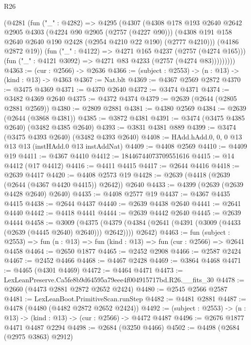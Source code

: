 \begin{lexlean}{R26}
\begin{coremodule}
            (@4281
              (fun ("_" : @4282) =>
              @4295
                (@4307
                  (@4308
                    @178
                    @193
                    @2640
                    @2642
                    @2905
                    @4303
                    (@4224 @90 @2905 (@2757 (@4227 @90)))
                    (@4308 @191 @158 @2640 @2640 @190 @2428 (@2954 @4210 @22 @190) (@2777 @4210)))
                  (@4186 @2872 @19))
                (fun ("_" : @4122) => @4271 @165 @4237 (@2757 (@4274 @165)))
                (fun ("_" : @4121 @3092) => @4271 @83 @4233 (@2757 (@4274 @83)))))))))
@4363 := (cur : @2566) -> @2636
@4366 := (subject : @2553) -> (n : @13) -> (kind : @13) -> @4363
@4367 := Nat.blt
@4369 := @4367 @2569 @2872
@4370 := @3475 @4369
@4371 := @4370 @2640
@4372 := @3474 @4371
@4374 := @3482 @4369 @2640
@4375 := @4372 @4374
@4379 := @2639 (@2644 (@2805 @2881 @2569))
@4380 := @2809 @2881
@4381 := @4380 @2569
@4384 := @2639 (@2644 (@3868 @4381))
@4385 := @3872 @4381
@4391 := @3474 (@3475 @4385 @2640) (@3482 @4385 @2640)
@4393 := @3831 @4381 @889
@4399 := @3474 (@3475 @4393 @2640) (@3482 @4393 @2640)
@4408 := HAdd.hAdd.{0, 0, 0} @13 @13 @13 (instHAdd.{0} @13 instAddNat)
@4409 := @4408 @2569
@4410 := @4409 @19
@4411 := @4367 @4410
@4412 := 18446744073709551616
@4415 := @14 @4412 (@17 @4412)
@4416 := @4411 @4415
@4417 := @2644 @4416
@4418 := @2639 @4417
@4420 := @4408 @2573 @19
@4428 := @2639 (@4418 (@2639 (@2644 (@4367 @4420 @4415)) @2642)) @2640
@4433 := @4399 (@2639 (@2639 @4428 @2640) @2640)
@4435 := @4408 @2577 @19
@4437 := @4367 @4435 @4415
@4438 := @2644 @4437
@4440 := @2639 @4438 @2640
@4441 := @2641 @4440
@4442 := @4418 @4441
@4444 := @2639 @4442 @2640
@4445 := @2639 @4444
@4458 := @3009
    (@4375 (@4379 (@4384 (@2641 (@4391 (@3009 (@4433 (@2639 (@4445 @2640) @2640))) @2642)))) @2642)
@4463 := fun (subject : @2553) =>
  fun (n : @13) => fun (kind : @13) => fun (cur : @2566) => @2641 @4458
@4464 := @2650 @1877
@4465 := @2452 @2908
@4466 := @2587 @2424
@4467 := @2452 @4466
@4468 := @4467 @2428
@4469 := @3864 @4468
@4471 := @4465 (@4301 @4469)
@4472 := @4464 @4471
@4473 := LexLeanPreserve.Ca5fe8b9d64595a79eee4f004915717bd.R26.__fits_30
@4478 := @2660 (@4473 @2881 @2872 @2652 @2424)
@4480 := @2545 @2566 @2587
@4481 := LexLeanBoot.PrimitiveScan.runStep
@4482 := @4481 @2881
@4487 := @4478 (@4480 (@4482 @2872 @2652 @2424))
@4492 := (subject : @2553) -> (n : @13) -> (kind : @13) -> (cur : @2566) -> @4472 @4487
@4496 := @2676 @1877 @4471 @4487 @2294
@4498 := @2684 (@3250 @4466)
@4502 := @4498 (@2684 (@2975 @3863) @2912)

\end{coremodule}
\end{lexlean}
